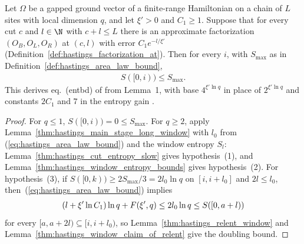 \begin{lemma}
    \label{thm:hastings_area_law_from_factorization}
    \leanok
    Let $\Omega$ be a gapped ground vector of a finite-range Hamiltonian on a
    chain of $L$ sites with local dimension $q$, and let $\xi'>0$ and
    $C_1\ge1$. Suppose that for every cut $c$ and $l\in\N$ with $c+l\le L$
    there is an approximate factorization $(O_B,O_L,O_R)$ at $(c,l)$ with error
    $C_1e^{-l/\xi'}$ (Definition~\ref{def:hastings_factorization_at}). Then
    for every $i$, with $S_{\max}$ as in
    Definition~\ref{def:hastings_area_law_bound},
    \begin{align}
        S(\lbrack0,i))\le S_{\max}.
        \label{eq:hastings_area_law_entbd}
    \end{align}
    This derives eq.~(entbd) of \cite{Hastings2007AreaLaw} from Lemma~1, with
    base $4^{\xi'\ln q}$ in place of $2^{\xi'\ln q}$
    \cite{gap:hastings07_doubling_constants} and constants $2C_1$ and $7$ in
    the entropy gain \cite{gap:hastings07_relent_constants}.
\end{lemma}
\begin{proof}\leanok
    For $q\le1$, $S(\lbrack0,i))=0\le S_{\max}$. For $q\ge2$, apply
    Lemma~\ref{thm:hastings_main_stage_long_window} with $l_0$ from
    (\ref{eq:hastings_area_law_bound}) and the window entropy $S_l$:
    Lemma~\ref{thm:hastings_cut_entropy_slow} gives hypothesis~(1), and
    Lemma~\ref{thm:hastings_window_entropy_bounds} gives hypothesis~(2). For
    hypothesis~(3), if $S(\lbrack0,k))\ge2S_{\max}/3=2l_0\ln q$ on $[i,i+l_0]$
    and $2l\le l_0$, then~(\ref{eq:hastings_area_law_bound}) implies
    \begin{align}
        (l+\xi'\ln C_1)\ln q+F(\xi',q)\le 2l_0\ln q\le S(\lbrack0,a+l))
        \notag
    \end{align}
    for every $\lbrack a,a+2l)\subseteq\lbrack i,i+l_0)$, so
    Lemma~\ref{thm:hastings_relent_window} and
    Lemma~\ref{thm:hastings_window_claim_of_relent} give the doubling bound.
\end{proof}

